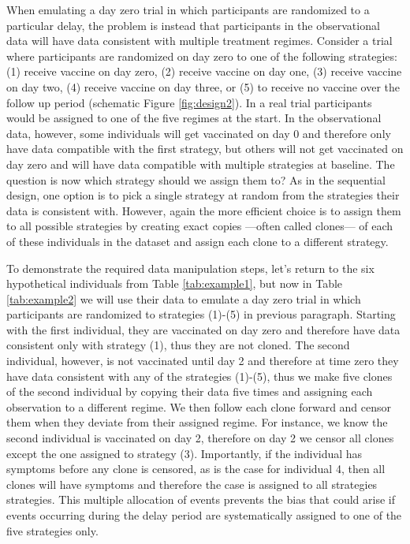 \begin{appendix}
    When emulating a day zero trial in which participants are randomized to a particular delay, the problem is instead that participants in the observational data will have data consistent with multiple treatment regimes. Consider a trial where participants are randomized on day zero to one of the following strategies: (1) receive vaccine on day zero, (2) receive vaccine on day one, (3) receive vaccine on day two, (4) receive vaccine on day three, or (5) to receive no vaccine over the follow up period (schematic Figure \ref{fig:design2}). In a real trial participants would be assigned to one of the five regimes at the start. In the observational data, however, some individuals will get vaccinated on day 0 and therefore only have data compatible with the first strategy, but others will not get vaccinated on day zero and will have data compatible with multiple strategies at baseline. The question is now which strategy should we assign them to? As in the sequential design, one option is to pick a single strategy at random from the strategies their data is consistent with. However, again the more efficient choice is to assign them to all possible strategies by creating exact copies ---often called clones--- of each of these individuals in the dataset and assign each clone to a different strategy. 

    To demonstrate the required data manipulation steps, let's return to the six hypothetical individuals from Table \ref{tab:example1}, but now in Table \ref{tab:example2} we will use their data to emulate a day zero trial in which participants are randomized to strategies (1)-(5) in previous paragraph. Starting with the first individual, they are vaccinated on day zero and therefore have data consistent only with strategy (1), thus they are not cloned. The second individual, however, is not vaccinated until day 2 and therefore at time zero they have data consistent with any of the strategies (1)-(5), thus we make five clones of the second individual by copying their data five times and assigning each observation to a different regime. We then follow each clone forward and censor them when they deviate from their assigned regime. For instance, we know the second individual is vaccinated on day 2, therefore on day 2 we censor all clones except the one assigned to strategy (3). Importantly, if the individual has symptoms before any clone is censored, as is the case for individual 4, then all clones will have symptoms and therefore the case is assigned to all strategies strategies. This multiple allocation of events prevents the bias that could arise if events occurring during the delay period are systematically assigned to one of the five strategies only.


\end{appendix}
